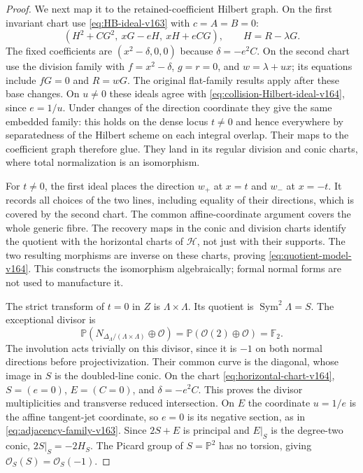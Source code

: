 \documentclass[11pt,reqno]{amsart}
\numberwithin{equation}{section}
\theoremstyle{definition}\newtheorem{definition}[theorem]{Definition}
\theoremstyle{remark}\newtheorem{remark}[theorem]{Remark}
\newcommand{\Pj}{\mathbb P}\newcommand{\A}{\mathbb A}
\newcommand{\OO}{\mathcal O}\newcommand{\II}{\mathcal I}
\begin{document}
\begin{proof}
We next map it to the retained-coefficient Hilbert graph. On the
first invariant chart use \eqref{eq:HB-ideal-v163} with $c=A=B=0$:
\begin{equation}\label{eq:collision-Hilbert-ideal-v164}
 (H^2+CG^2,\ xG-eH,\ xH+eCG),\qquad H=R-\lambda G.
\end{equation}
The fixed coefficients are $(x^2-\delta,0,0)$ because
$\delta=-e^2C$. On the second chart use the division family with
$f=x^2-\delta$, $g=r=0$, and $w=\lambda+ux$; its equations include
$fG=0$ and $R=wG$. The original flat-family results apply after
these base changes. On $u\ne0$ these ideals agree with
\eqref{eq:collision-Hilbert-ideal-v164}, since $e=1/u$.
Under changes of the direction coordinate they give the same
embedded family: this holds on the dense locus $t\ne0$ and hence
everywhere by separatedness of the Hilbert scheme on each integral
overlap. Their maps to the coefficient graph therefore glue.
They land in its regular division and conic charts, where total
normalization is an isomorphism.

For $t\ne0$, the first ideal places the direction $w_+$ at $x=t$
and $w_-$ at $x=-t$. It records all choices of the two lines,
including equality of their directions, which is covered by the
second chart. The common affine-coordinate argument covers the
whole generic fibre. The recovery maps in the conic and division
charts identify the quotient with the horizontal charts of
$\mathcal H$, not just with their supports. The two resulting
morphisms are inverse on these charts, proving
\eqref{eq:quotient-model-v164}. This constructs the isomorphism
algebraically; formal normal forms are not used to manufacture it.

The strict transform of $t=0$ in $Z$ is
$\Lambda\times\Lambda$. Its quotient is
$\operatorname{Sym}^2\Lambda=S$. The exceptional divisor is
\[
 \Pj(N_{\Delta_\Lambda/(\Lambda\times\Lambda)}\oplus\OO)
       =\Pj(\OO(2)\oplus\OO)=\mathbb F_2.
\]
The involution acts trivially on this divisor, since it is $-1$
on both normal directions before projectivization. Their common
curve is the diagonal, whose image in $S$ is the doubled-line
conic. On the chart \eqref{eq:horizontal-chart-v164}, $S=(e=0)$,
$E=(C=0)$, and $\delta=-e^2C$. This proves the divisor multiplicities
and transverse reduced intersection. On $E$ the coordinate
$u=1/e$ is the affine tangent-jet coordinate, so $e=0$ is its
negative section, as in \eqref{eq:adjacency-family-v163}.
Since $2S+E$ is principal and $E|_S$ is the degree-two conic,
$2S|_S=-2H_S$. The Picard group of $S=\Pj^2$ has no torsion,
giving $\OO_S(S)=\OO_S(-1)$.


\end{proof}
\end{document}
